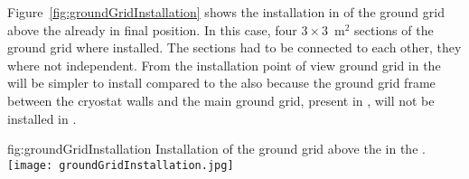 Figure~\ref{fig:groundGridInstallation} shows the installation in  of the ground grid above the  already in final position.
In this case, four $3 \times 3$~m$^2$ sections of the ground grid where installed.
The sections had to be connected to each other, they where not independent.
From the installation point of view ground grid in the  will be simpler to install compared to the  also because the ground grid frame between the cryostat walls and the main ground grid, present in , will not be installed in .

\begin{dunefigure}{fig:groundGridInstallation}
{Installation of the ground grid above the  in the .}
\texttt{[image: groundGridInstallation.jpg]}
\end{dunefigure}

